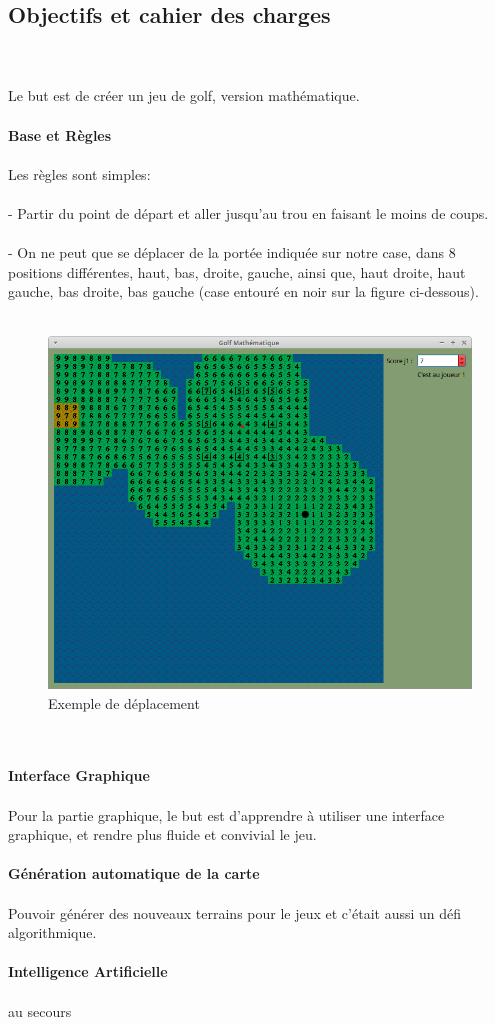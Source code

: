 \documentclass{article}
\begin{document}
\subsection{Objectifs et cahier des charges}
~\\~\\
Le but est de créer un jeu de golf, version mathématique.
\\~\\
\textbf{\large Base et Règles}
\\~\\
Les règles sont simples:
\\~\\
- Partir du point de départ et aller jusqu'au trou en faisant le moins de coups.
\\~\\
- On ne peut que se déplacer de la portée indiquée sur notre case, dans 8 positions différentes, haut, bas, droite, gauche, ainsi que, haut droite, haut gauche, bas droite, bas gauche (case entouré en noir sur la figure ci-dessous).
\\~\\
\begin{figure}[!h]
\centering
\includegraphics[scale=0.3]{Images/move.png}
\caption{Exemple de déplacement}
\end{figure}
\\~\\
\newpage
\textbf{\large Interface Graphique}
\\~\\
Pour la partie graphique, le but est d'apprendre à utiliser une interface graphique, et rendre plus fluide et convivial le jeu.
\\~\\
\textbf{\large Génération automatique de la carte}
\\~\\
Pouvoir générer des nouveaux terrains pour le jeux et c'était aussi un défi algorithmique.
\\~\\
\textbf{\large Intelligence Artificielle}
\\~\\
au secours
\\~\\
\newpage
\end{document}
